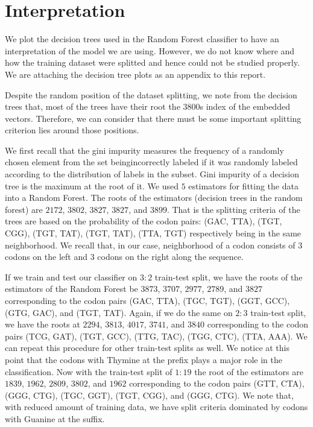 \documentclass[oneside, twocolumn, a4paper, 10pt]{IEEEtran}
\begin{document}
\section{Interpretation} 
We plot the decision trees used in the Random Forest classifier to have an interpretation of the model we are using. However, we do not know where and how the training dataset were splitted and hence could not be studied properly. We are attaching the decision tree plots as an appendix to this report.\\
\par 
Despite the random position of the dataset splitting, we note from the decision trees that, most of the trees have their root the $3800$s index of the embedded vectors. Therefore, we can consider that there must be some important splitting criterion lies around those positions.\\
\par 
We first recall that the gini impurity measures the frequency of a randomly chosen element from the set beingincorrectly labeled if it was randomly labeled according to the distribution of labels in the subset. Gini impurity of a decision tree is the maximum at the root of it. We used $5$ estimators for fitting the data into a Random Forest. The roots of the estimators (decision trees in the random forest) are $2172$, $3802$, $3827$, $3827$, and $3899$. That is the splitting criteria of the trees are based on the probability of the codon pairs: (GAC, TTA), (TGT, CGG), (TGT, TAT), (TGT, TAT), (TTA, TGT) respectively being in the same neighborhood. We recall that, in our case, neighborhood of a codon consists of $3$ codons on the left and $3$ codons on the right along the sequence.\\
\par 
If we train and test our classifier on $3:2$ train-test split, we have the roots of the estimators of the Random Forest be $3873$, $3707$, $2977$, $2789$, and $3827$ corresponding to the codon pairs (GAC, TTA), (TGC, TGT), (GGT, GCC), (GTG, GAC), and (TGT, TAT). Again, if we do the same on $2:3$ train-test split, we have the roots at $2294$, $3813$, $4017$, $3741$, and $3840$ corresponding to the codon pairs (TCG, GAT), (TGT, GCC), (TTG, TAC), (TGG, CTC), (TTA, AAA). We can repeat this procedure for other train-test splits as well. We notice at this point that the codons with Thymine at the prefix plays a major role in the classification. Now with the train-test split of $1:19$ the root of the estimators are $1839$, $1962$, $2809$, $3802$, and $1962$ corresponding to the codon pairs (GTT, CTA), (GGG, CTG), (TGC, GGT), (TGT, CGG), and (GGG, CTG). We note that, with reduced amount of training data, we have split criteria dominated by codons with Guanine at the suffix.
\end{document}
